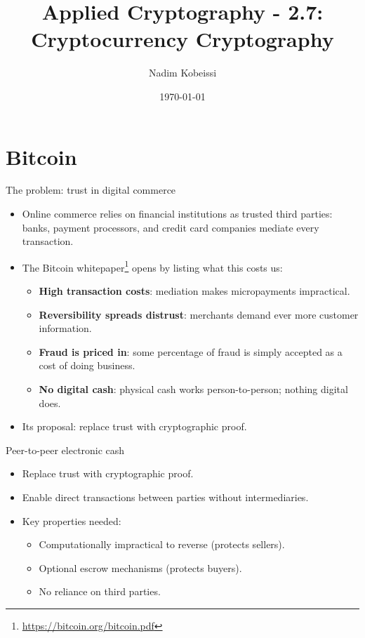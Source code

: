 \ifdefined\PRESENTATION\else\PassOptionsToClass{handout}{beamer}\fi\documentclass[aspectratio=169, lualatex]{beamer}
\title{Applied Cryptography - 2.7: Cryptocurrency Cryptography}
\author{Nadim Kobeissi}
\institute{Symbolic Software}
\date{\today}
\begin{document}
\begin{frame}[plain]
	\titlepage
\end{frame}

\section{Bitcoin}

\begin{frame}{The problem: trust in digital commerce}
	\begin{itemize}
		\item Online commerce relies on financial institutions as trusted third parties: banks, payment processors, and credit card companies mediate every transaction.
		\item The Bitcoin whitepaper\footnote{\url{https://bitcoin.org/bitcoin.pdf}} opens by listing what this costs us:
		      \begin{itemize}
			      \item \textbf{High transaction costs}: mediation makes micropayments impractical.
			      \item \textbf{Reversibility spreads distrust}: merchants demand ever more customer information.
			      \item \textbf{Fraud is priced in}: some percentage of fraud is simply accepted as a cost of doing business.
			      \item \textbf{No digital cash}: physical cash works person-to-person; nothing digital does.
		      \end{itemize}
		\item Its proposal: replace trust with cryptographic proof.
	\end{itemize}
\end{frame}

\begin{frame}{Peer-to-peer electronic cash}
	\begin{itemize}
		\item Replace trust with cryptographic proof.
		\item Enable direct transactions between parties without intermediaries.
		\item Key properties needed:
		      \begin{itemize}
			      \item Computationally impractical to reverse (protects sellers).
			      \item Optional escrow mechanisms (protects buyers).
			      \item No reliance on third parties.
		      \end{itemize}
	\end{itemize}
\end{frame}
\end{document}
